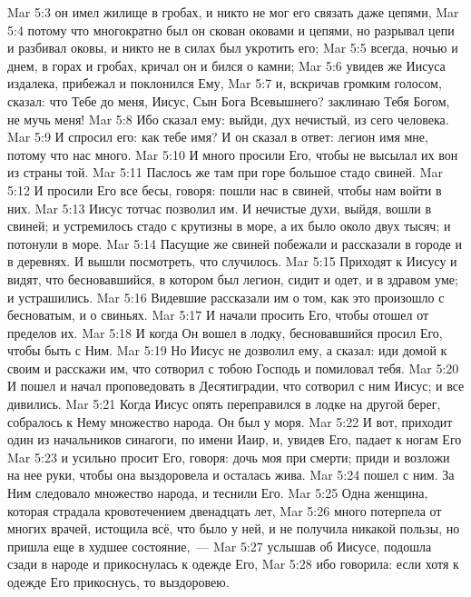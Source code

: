 \vs Mar 5:3 он имел жилище в гробах, и никто не мог его связать даже цепями,
\vs Mar 5:4 потому что многократно был он скован оковами и цепями, но разрывал цепи и разбивал оковы, и никто не в силах был укротить его;
\vs Mar 5:5 всегда, ночью и днем, в горах и гробах, кричал он и бился о камни;
\vs Mar 5:6 увидев же Иисуса издалека, прибежал и поклонился Ему,
\vs Mar 5:7 и, вскричав громким голосом, сказал: что Тебе до меня, Иисус, Сын Бога Всевышнего? заклинаю Тебя Богом, не мучь меня!
\vs Mar 5:8 Ибо  сказал ему: выйди, дух нечистый, из сего человека.
\vs Mar 5:9 И спросил его: как тебе имя? И он сказал в ответ: легион имя мне, потому что нас много.
\vs Mar 5:10 И много просили Его, чтобы не высылал их вон из страны той.
\vs Mar 5:11 Паслось же там при горе большое стадо свиней.
\vs Mar 5:12 И просили Его все бесы, говоря: пошли нас в свиней, чтобы нам войти в них.
\vs Mar 5:13 Иисус тотчас позволил им. И нечистые духи, выйдя, вошли в свиней; и устремилось стадо с крутизны в море, а их было около двух тысяч; и потонули в море.
\vs Mar 5:14 Пасущие же свиней побежали и рассказали в городе и в деревнях. И  вышли посмотреть, что случилось.
\vs Mar 5:15 Приходят к Иисусу и видят, что бесновавшийся, в котором был легион, сидит и одет, и в здравом уме; и устрашились.
\vs Mar 5:16 Видевшие рассказали им о том, как это произошло с бесноватым, и о свиньях.
\vs Mar 5:17 И начали просить Его, чтобы отошел от пределов их.
\vs Mar 5:18 И когда Он вошел в лодку, бесновавшийся просил Его, чтобы быть с Ним.
\vs Mar 5:19 Но Иисус не дозволил ему, а сказал: иди домой к своим и расскажи им, что сотворил с тобою Господь и  помиловал тебя.
\vs Mar 5:20 И пошел и начал проповедовать в Десятиградии, что сотворил с ним Иисус; и все дивились.
\rsbpar\vs Mar 5:21 Когда Иисус опять переправился в лодке на другой берег, собралось к Нему множество народа. Он был у моря.
\vs Mar 5:22 И вот, приходит один из начальников синагоги, по имени Иаир, и, увидев Его, падает к ногам Его
\vs Mar 5:23 и усильно просит Его, говоря: дочь моя при смерти; приди и возложи на нее руки, чтобы она выздоровела и осталась жива.
\vs Mar 5:24  пошел с ним. За Ним следовало множество народа, и теснили Его.
\rsbpar\vs Mar 5:25 Одна женщина, которая страдала кровотечением двенадцать лет,
\vs Mar 5:26 много потерпела от многих врачей, истощила всё, что было у ней, и не получила никакой пользы, но пришла еще в худшее состояние,~---
\vs Mar 5:27 услышав об Иисусе, подошла сзади в народе и прикоснулась к одежде Его,
\vs Mar 5:28 ибо говорила: если хотя к одежде Его прикоснусь, то выздоровею.
